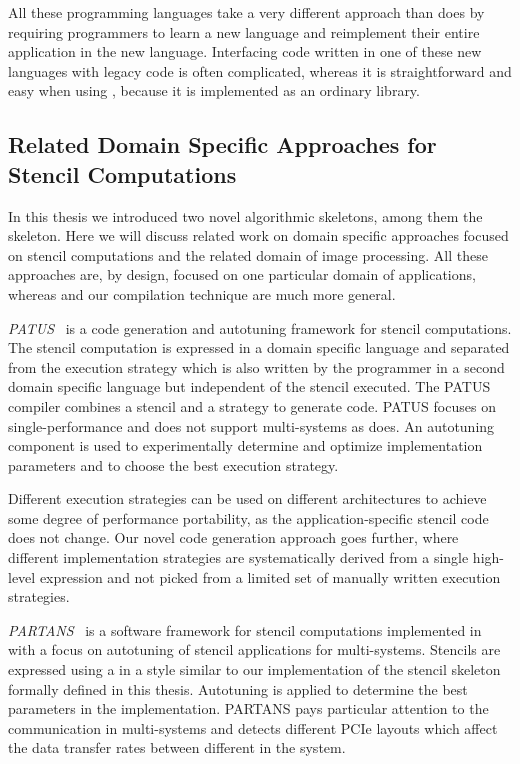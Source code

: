 \bigskip
All these programming languages take a very different approach than \SkelCL does by requiring programmers to learn a new language and reimplement their entire application in the new language.
Interfacing code written in one of these new languages with legacy code is often complicated, whereas it is straightforward and easy when using \SkelCL, because it is implemented as an ordinary \Cpp library.

\subsection[Related Domain Specific Approaches for\\ Stencil Computations]{Related Domain Specific Approaches for Stencil Computations}
In this thesis we introduced two novel algorithmic skeletons, among them the \stencil skeleton.
Here we will discuss related work on domain specific approaches focused on stencil computations and the related domain of image processing.
All these approaches are, by design, focused on one particular domain of applications, whereas \SkelCL and our compilation technique are much more general.

\bigskip

\emph{{\small PATUS}}~\cite{ChristenSB11} is a code generation and autotuning framework for stencil computations.
The stencil computation is expressed in a domain specific language and separated from the execution strategy which is also written by the programmer in a second domain specific language but independent of the stencil executed.
The {\small PATUS} compiler combines a stencil and a strategy to generate \OpenCL code.
{\small PATUS} focuses on single-\GPU performance and does not support multi-\GPU systems as \SkelCL does.
An autotuning component is used to experimentally determine and optimize implementation parameters and to choose the best execution strategy.

Different execution strategies can be used on different architectures to achieve some degree of performance portability, as the application-specific stencil code does not change.
Our novel code generation approach goes further, where different implementation strategies are systematically derived from a single high-level expression and not picked from a limited set of manually written execution strategies.

\bigskip

\emph{{\small PARTANS}}~\cite{LutzFC13} is a software framework for stencil computations implemented in \Cpp with a focus on autotuning of stencil applications for multi-\GPU systems.
Stencils are expressed using a \Cpp \API in a style similar to our \SkelCL \Cpp implementation of the stencil skeleton formally defined in this thesis.
Autotuning is applied to determine the best parameters in the implementation.
{\small PARTANS} pays particular attention to the communication in multi-\GPU systems and detects different PCIe layouts which affect the data transfer rates between different \GPUs in the system.

